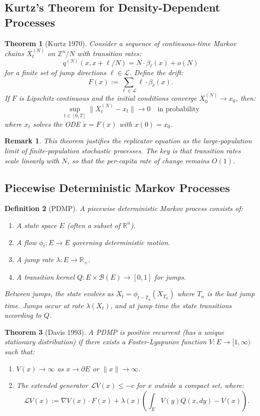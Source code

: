 \documentclass[12pt]{article}
\newtheorem{theorem}{Theorem}[section]
\newtheorem{definition}[theorem]{Definition}
\newtheorem{remark}{Remark}[section]
\newcommand{\R}{\mathbb{R}}
\newcommand{\Z}{\mathbb{Z}}
\begin{document}
\subsection{Kurtz's Theorem for Density-Dependent Processes}

\begin{theorem}[Kurtz 1970]
\label{thm:kurtz}
Consider a sequence of continuous-time Markov chains $X^{(N)}_t$ on $\Z^n / N$ with transition rates:
\[
q^{(N)}(x, x + \ell/N) = N \cdot \beta_\ell(x) + o(N)
\]
for a finite set of jump directions $\ell \in \mathcal{L}$. Define the drift:
\[
F(x) := \sum_{\ell \in \mathcal{L}} \ell \cdot \beta_\ell(x).
\]
If $F$ is Lipschitz continuous and the initial conditions converge $X^{(N)}_0 \to x_0$, then:
\[
\sup_{t \in [0, T]} \|X^{(N)}_t - x_t\| \to 0 \quad \text{in probability}
\]
where $x_t$ solves the ODE $\dot{x} = F(x)$ with $x(0) = x_0$.
\end{theorem}

\begin{remark}
This theorem justifies the replicator equation as the large-population limit of finite-population stochastic processes. The key is that transition rates scale linearly with $N$, so that the per-capita rate of change remains $O(1)$.
\end{remark}

\subsection{Piecewise Deterministic Markov Processes}

\begin{definition}[PDMP]
A \emph{piecewise deterministic Markov process} consists of:
\begin{enumerate}
    \item A state space $E$ (often a subset of $\R^n$).
    \item A flow $\phi_t: E \to E$ governing deterministic motion.
    \item A jump rate $\lambda: E \to \R_+$.
    \item A transition kernel $Q: E \times \mathcal{B}(E) \to [0, 1]$ for jumps.
\end{enumerate}
Between jumps, the state evolves as $X_t = \phi_{t - T_n}(X_{T_n})$ where $T_n$ is the last jump time. Jumps occur at rate $\lambda(X_t)$, and at jump time the state transitions according to $Q$.
\end{definition}

\begin{theorem}[Davis 1993]
\label{thm:davis}
A PDMP is positive recurrent (has a unique stationary distribution) if there exists a Foster-Lyapunov function $V: E \to [1, \infty)$ such that:
\begin{enumerate}
    \item $V(x) \to \infty$ as $x \to \partial E$ or $\|x\| \to \infty$.
    \item The extended generator $\mathcal{L} V(x) \leq -c$ for $x$ outside a compact set, where:
    \[
    \mathcal{L} V(x) := \nabla V(x) \cdot F(x) + \lambda(x) \left( \int_E V(y) Q(x, dy) - V(x) \right).
    \]
\end{enumerate}
\end{theorem}
\end{document}
